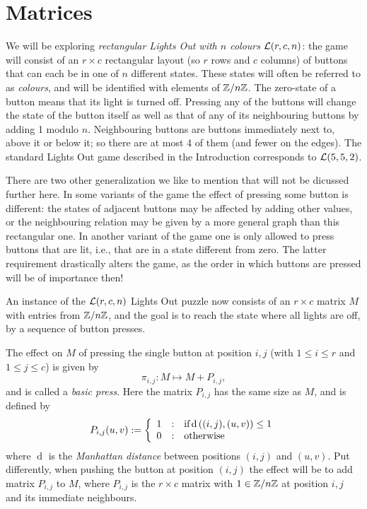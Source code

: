 \section{Matrices}\label{sec:def}
We will be exploring {\it rectangular Lights Out with
$n$ colours} $\mathcal{L}(r, c, n)$: the game will consist of an $r\times c$ rectangular
layout (so $r$ rows and $c$ columns) of buttons that can each be
in one of $n$ different states. These states will often be referred to
as {\it colours}, and will be identified with elements
of $\mathbb{Z}/n\mathbb{Z}$. 
The zero-state of a button means that its light is turned off.
Pressing any of the buttons will change the state
of the button itself as well as that of any of its neighbouring buttons
by adding 1 modulo $n$. 
Neighbouring buttons are buttons
immediately next to, above it or below it; so there are at most 4
of them (and fewer on the edges).
The standard Lights Out game described in the Introduction
corresponds to $\mathcal{L}(5,5,2)$.

\begin{remark}
There are two other generalization we like to mention that will not be
dicussed further here. In some variants of the game the effect of pressing some
button is different: the states of adjacent buttons may be affected by adding
other values, or the neighbouring relation may be given by a more general
graph than this rectangular one. In another variant of the game one is
only allowed to press buttons that are lit, i.e., that are in a state
different from zero. The latter requirement drastically alters the
game, as the order in which buttons are pressed will be of importance then!
\end{remark}
%
An instance of the $\mathcal{L}(r, c, n)$ Lights Out puzzle now consists
of an $r\times c$ matrix $M$ with entries from $\mathbb{Z}/n\mathbb{Z}$, and the goal
is to reach the state where all lights are off, by a sequence of button
presses.

The effect on $M$ of pressing the single button at position $i, j$
(with $1\leq i \leq r$ and $1\leq j \leq c$) is given by
$$\pi_{i,j}: M\mapsto M+P_{i, j},$$
and is called a {\it basic press}.
Here the matrix $P_{i,j}$ has the same size as $M$, and is
defined by
\[
    P_{i,j}{(u,v)} :=
    \left\{
    \begin{array}{l@{\quad:\quad}l}
        1 & \text{if} \operatorname{d}\left((i,j), (u,v)\right) \leq 1 \\
        0 & \text{otherwise}
    \end{array}
    \right.
\]
where $\operatorname{d}$ is the \emph{Manhattan distance} between 
positions $(i,j)$ and $(u,v)$.
Put differently, when pushing the button at position $(i, j)$ the effect will
be to add matrix $P_{i,j}$ to $M$, where $P_{i,j}$ is the $r\times c$ matrix
with $1\in\mathbb{Z}/n\mathbb{Z}$ at position $i, j$ and its immediate neighbours.

